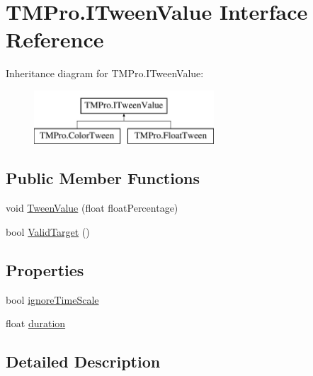 \hypertarget{interface_t_m_pro_1_1_i_tween_value}{}\section{T\+M\+Pro.\+I\+Tween\+Value Interface Reference}
\label{interface_t_m_pro_1_1_i_tween_value}
Inheritance diagram for T\+M\+Pro.\+I\+Tween\+Value\+:\begin{figure}[H]
\begin{center}
\leavevmode
\includegraphics[height=2.000000cm]{interface_t_m_pro_1_1_i_tween_value}
\end{center}
\end{figure}
\subsection*{Public Member Functions}
\begin{DoxyCompactItemize}
\item 
void \mbox{\hyperlink{interface_t_m_pro_1_1_i_tween_value_aed9322f3d92691a29267b72c104b40bf}{Tween\+Value}} (float float\+Percentage)
\item 
bool \mbox{\hyperlink{interface_t_m_pro_1_1_i_tween_value_ae0e763108b1d0fe8f9e34661a16fa994}{Valid\+Target}} ()
\end{DoxyCompactItemize}
\subsection*{Properties}
\begin{DoxyCompactItemize}
\item 
bool \mbox{\hyperlink{interface_t_m_pro_1_1_i_tween_value_a4b32d163a38f053e9e7a830c44174fb4}{ignore\+Time\+Scale}}
\item 
float \mbox{\hyperlink{interface_t_m_pro_1_1_i_tween_value_a1b13b53073d463536d1c1c8165bc2a24}{duration}}
\end{DoxyCompactItemize}


\subsection{Detailed Description}


